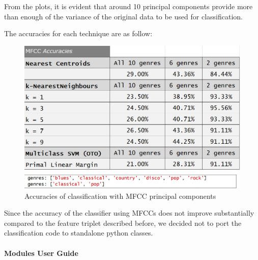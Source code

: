 \documentclass[12pt]{article}
\begin{document}
	From the plots, it is evident that around 10 principal components provide more than enough of the variance of the original data to be used for classification.
	
	The accuracies for each technique are as follow:
	\begin{figure}[H]
		\hspace{120pt}\includegraphics[scale=0.44]{mfcc_acc}
		\caption{Accuracies of classification with MFCC principal components}
	\end{figure}
	Since the accuracy of the classifier using MFCCs does not improve substantially compared to the feature triplet described before, we decided not to port the classification code to standalone python classes.
	\newpage
	
	\paragraph{Modules User Guide}\mbox{}
	\newpage
	\printbibliography
\end{document}
